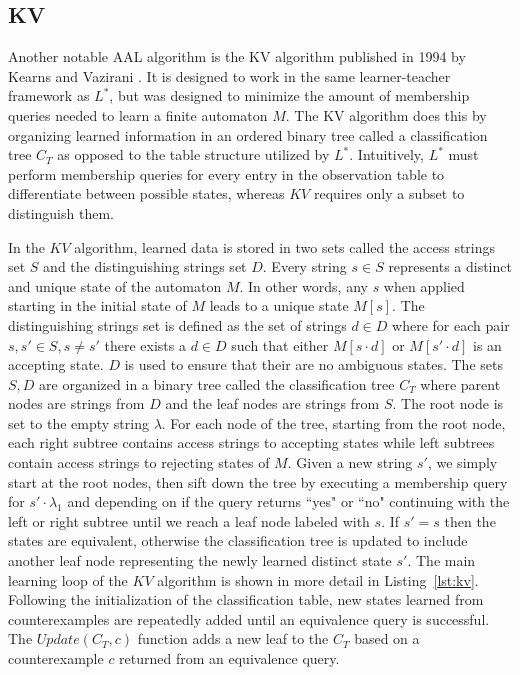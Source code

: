 \subsection{KV}
Another notable AAL algorithm is the KV algorithm published in 1994 by Kearns and Vazirani \cite{KV1994}. It is designed to work in the same learner-teacher framework as $L^*$, but was designed to minimize the amount of membership queries needed to learn a finite automaton $M$. The KV algorithm does this by organizing learned information in an ordered binary tree called a classification tree $C_T$ as opposed to the table structure utilized by $L^*$. Intuitively, $L^*$ must perform membership queries for every entry in the observation table to differentiate between possible states, whereas $KV$ requires only a subset to distinguish them. 

In the $KV$ algorithm, learned data is stored in two sets called the access strings set $S$ and the distinguishing strings set $D$. Every string $s \in S$ represents a distinct and unique state of the automaton $M$. In other words, any $s$ when applied starting in the initial state of $M$ leads to a unique state $M[s]$. The distinguishing strings set is defined as the set of strings $d \in D$ where for each pair $s,s' \in S, s \neq s'$ there exists a $d \in D$ such that either $M[s \cdot d]$ or $M[s' \cdot d]$ is an accepting state. $D$ is used to ensure that their are no ambiguous states. The sets $S,D$ are organized in a binary tree called the classification tree $C_T$ where parent nodes are strings from $D$ and the leaf nodes are strings from $S$. The root node is set to the empty string $\lambda$. For each node of the tree, starting from the root node, each right subtree contains access strings to accepting states while left subtrees contain access strings to rejecting states of $M$.
Given a new string $s'$, we simply start at the root nodes, then sift down the tree by executing a membership query for $s' \cdot \lambda_1$ and depending on if the query returns ``yes" or ``no" continuing with the left or right subtree until we reach a leaf node labeled with $s$. If $s' = s$ then the states are equivalent, otherwise the classification tree is updated to include another leaf node representing the newly learned distinct state $s'$. The main learning loop of the $KV$ algorithm is shown in more detail in Listing~\ref{lst:kv}. Following the initialization of the classification table, new states learned from counterexamples are repeatedly added until an equivalence query is successful. The $Update(C_T,c)$ function adds a new leaf to the $C_T$ based on a counterexample $c$ returned from an equivalence query.

